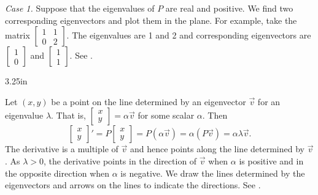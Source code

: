 \emph{Case 1.}  Suppose that the eigenvalues of $P$ are real and positive.
We find two corresponding eigenvectors and plot them in the plane.  For
example, take the
matrix $\left[ \begin{smallmatrix} 1 & 1 \\ 0 & 2 \end{smallmatrix}
\right]$.
The eigenvalues are 1 and 2 and corresponding eigenvectors are
$\left[ \begin{smallmatrix} 1 \\ 0 \end{smallmatrix} \right]$ and
$\left[ \begin{smallmatrix} 1 \\ 1 \end{smallmatrix} \right]$.  See
.

\begin{mywrapfig}[14]{3.25in}
\capstart
{}
\caption{Eigenvectors of $P$.\label{pln:source-eigfig}}
\end{mywrapfig}

Let $(x,y)$ be a point on the line determined by an eigenvector
$\vec{v}$ for an eigenvalue $\lambda$.
That is,
$\left[ \begin{smallmatrix} x \\ y \end{smallmatrix} \right] = \alpha \vec{v}$
for some scalar $\alpha$.
Then 
\begin{equation*}
\begin{bmatrix} x \\ y \end{bmatrix} '
=
P \begin{bmatrix} x \\ y \end{bmatrix}
=
P ( \alpha \vec{v} ) =  \alpha ( P \vec{v} )
= \alpha \lambda \vec{v} .
\end{equation*}
The derivative is a multiple of $\vec{v}$ and hence points along the
line determined by $\vec{v}$.  As $\lambda > 0$, the derivative points in the
direction of $\vec{v}$ when $\alpha$ is positive and in the opposite direction
when $\alpha$ is negative.  We draw the lines determined by
the eigenvectors and
arrows on the lines to indicate the directions.
See .

